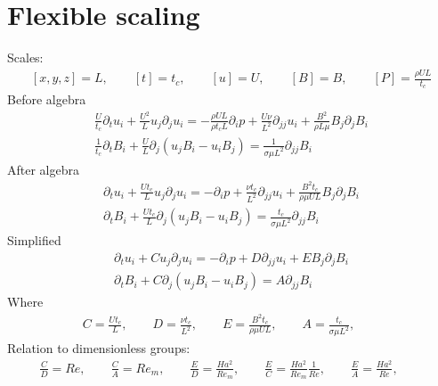 \documentclass[11pt]{article}
\newcommand{\PD}{\partial}
\begin{document}
\section{Flexible scaling}
Scales:
\begin{equation}\begin{aligned}
	[x,y,z] = L, \qquad
	[t] = t_c, \qquad
	[u] = U, \qquad
	[B] = B, \qquad
	[P] = \frac{\rho U L}{t_c}
\end{aligned} \end{equation}
Before algebra
\begin{equation}\begin{aligned}
\frac{U}{t_c} \PD_t u_i+ \frac{U^2}{L} u_j\PD_j u_i =-\frac{\rho U L}{\rho t_c L}\PD_i p+ \frac{U \nu}{L^2} \PD_{jj} u_i + \frac{B^2}{\rho L \mu} B_j \PD_j B_i \\
\frac{1}{t_c} \PD_t B_i + \frac{U}{L} \PD_j (u_j B_i - u_i B_j) = \frac{1}{\sigma \mu L^2} \PD_{jj} B_i
\end{aligned} \end{equation}
After algebra
\begin{equation}\begin{aligned}
\PD_t u_i+ \frac{U t_c}{L} u_j\PD_j u_i =-\PD_i p + \frac{\nu t_c}{L^2} \PD_{jj} u_i + \frac{B^2 t_c}{\rho \mu U L} B_j \PD_j B_i \\
\PD_t B_i + \frac{U t_c}{L} \PD_j (u_j B_i - u_i B_j) = \frac{t_c}{\sigma \mu L^2} \PD_{jj} B_i
\end{aligned} \end{equation}
Simplified
\begin{equation}\boxed{\begin{aligned}
\PD_t u_i+ C u_j\PD_j u_i = - \PD_i p+ D \PD_{jj} u_i + E B_j \PD_j B_i \\
\PD_t B_i + C \PD_j (u_j B_i - u_i B_j) = A \PD_{jj} B_i
\end{aligned}}\end{equation}
Where
\begin{equation}\boxed{\begin{aligned}
	C = \frac{U t_c}{L}, \qquad
	D = \frac{\nu t_c}{L^2}, \qquad
	E = \frac{B^2 t_c}{\rho \mu U L}, \qquad
	A = \frac{t_c}{\sigma \mu L^2}, \qquad
\end{aligned}}\end{equation}
Relation to dimensionless groups:
\begin{equation}\begin{aligned}
	\frac{C}{D} = Re, \qquad
	\frac{C}{A} = Re_m, \qquad
	\frac{E}{D} = \frac{Ha^2}{Re_m}, \qquad
	\frac{E}{C} = \frac{Ha^2}{Re_m} \frac{1}{Re}, \qquad
	\frac{E}{A} = \frac{Ha^2}{Re}, \qquad
\end{aligned} \end{equation}
\end{document}
